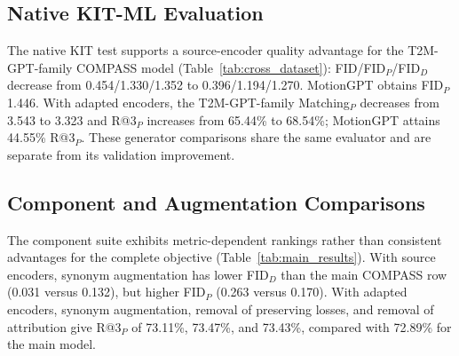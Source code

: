 \subsection{Native KIT-ML Evaluation}
\begin{table}[t]
\centering
\caption{Contextual HumanML3D component comparison on 4,380 prompt pairs. FID variants use source encoders; other columns use adapted encoders. Parent/main rows reuse Table~\ref{tab:humanml_methods}. Source budgets and endpoints differ, precluding a matched causal ablation. Bold marks the column best; diversity is closest to 9.137.}
\label{tab:main_results}
\resulttablesetup

\end{table}
The native KIT test supports a source-encoder quality advantage for the
T2M-GPT-family COMPASS model (Table~\ref{tab:cross_dataset}): FID/FID$_P$/FID$_D$
decrease from 0.454/1.330/1.352 to 0.396/1.194/1.270. MotionGPT obtains
FID$_P$ 1.446. With adapted encoders, the T2M-GPT-family Matching$_P$ decreases
from 3.543 to 3.323 and R@3$_P$ increases from 65.44\% to 68.54\%; MotionGPT
attains 44.55\% R@3$_P$. These generator comparisons share the same evaluator
and are separate from its validation improvement.

\subsection{Component and Augmentation Comparisons}
\label{sec:detail_component_removal}
\begin{table}[t]
\centering
\caption{HumanML3D-to-KIT text transfer on 734 P2/P3 pairs, without KIT generator adaptation. FID$_D$ uses HumanML3D source encoders; other columns use HumanML3D-adapted encoders and separate generations. The HumanML3D evaluator is frozen. Bold marks the better value in each column under the direction given in its header. Retrieval and first-token agreement are percentages.}
\label{tab:human_to_kit}
\resulttablesetup

\end{table}
The component suite exhibits metric-dependent rankings rather than consistent
advantages for the complete objective (Table~\ref{tab:main_results}). With
source encoders, synonym augmentation has lower FID$_D$ than the main COMPASS
row (0.031 versus 0.132), but higher FID$_P$ (0.263 versus 0.170).
With adapted encoders, synonym augmentation, removal of preserving losses,
and removal of attribution give R@3$_P$ of 73.11\%, 73.47\%, and 73.43\%,
compared with 72.89\% for the main model.

